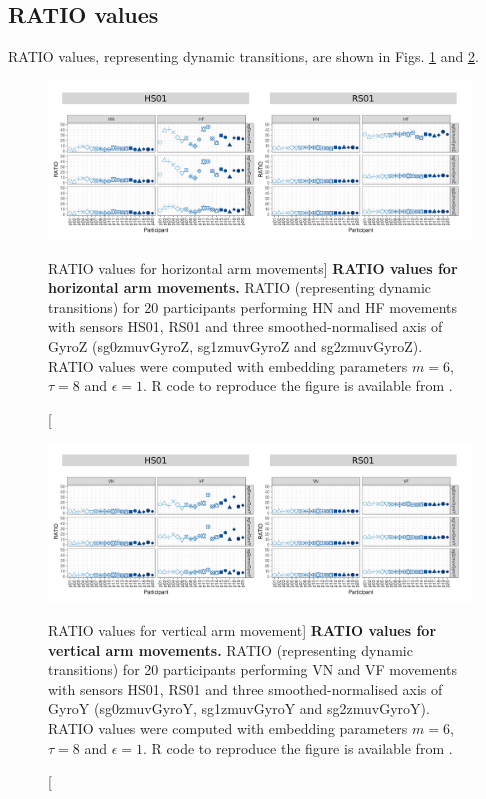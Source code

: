 \newpage
\subsection{RATIO values}
RATIO values, representing dynamic transitions, 
are shown in Figs. \ref{fig:ratio_aH} and \ref{fig:ratio_aV}.


\begin{figure}
\centering
\includegraphics[width=1.0\textwidth]{ratio_aH}
    \caption
	[RATIO values for horizontal arm movements]{
	{\bf RATIO values for horizontal arm movements.}
	RATIO (representing dynamic transitions) for 
	20 participants performing HN and HF movements
	with sensors HS01, RS01 and three smoothed-normalised axis 
	of GyroZ (sg0zmuvGyroZ, sg1zmuvGyroZ and sg2zmuvGyroZ).
	RATIO values were computed with 
	embedding parameters $m=6$, $\tau=8$ and $\epsilon=1$.
	R code to reproduce the figure is available from \cite{hwum2018}.
        }
    \label{fig:ratio_aH}
\end{figure}
\begin{figure}
\centering
\includegraphics[width=1.0\textwidth]{ratio_aV}
    \caption
	[RATIO values for vertical arm movement]{
	{\bf RATIO values for vertical arm movements.}
	RATIO (representing dynamic transitions) for 
	20 participants performing VN and VF movements
	with sensors HS01, RS01 and three smoothed-normalised axis 
	of GyroY (sg0zmuvGyroY, sg1zmuvGyroY and sg2zmuvGyroY).
	RATIO values were computed with
	embedding parameters $m=6$, $\tau=8$ and $\epsilon=1$.
	R code to reproduce the figure is available from \cite{hwum2018}.
        }
    \label{fig:ratio_aV}
\end{figure}



